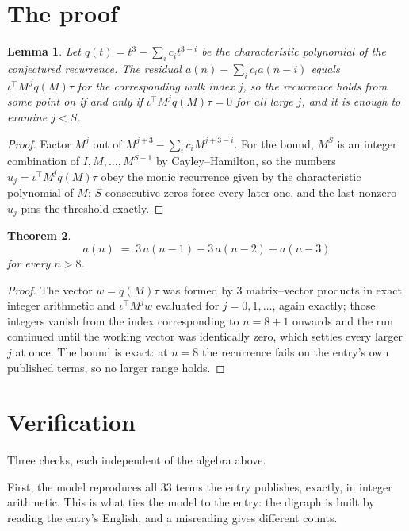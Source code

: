 \documentclass[11pt,a4paper]{article}
\theoremstyle{plain}
\newtheorem{theorem}{Theorem}
\newtheorem{lemma}[theorem]{Lemma}
\theoremstyle{definition}
\begin{document}
\section{The proof}

\begin{lemma}\label{lem:crit}
Let $q(t)=t^{3}-\sum_i c_it^{3-i}$ be the characteristic polynomial of the
conjectured recurrence. The residual $a(n)-\sum_ic_ia(n-i)$ equals
$\iota^{\!\top}M^{\,j}q(M)\tau$ for the corresponding walk index $j$, so the recurrence
holds from some point on if and only if $\iota^{\!\top}M^{j}q(M)\tau=0$ for all large $j$,
and it is enough to examine $j<S$.
\end{lemma}

\begin{proof}
Factor $M^{j}$ out of $M^{j+3}-\sum_ic_iM^{j+3-i}$. For the bound, $M^{S}$
is an integer combination of $I,M,\dots,M^{S-1}$ by Cayley--Hamilton, so the numbers
$u_j=\iota^{\!\top}M^{j}q(M)\tau$ obey the monic recurrence given by the characteristic
polynomial of $M$; $S$ consecutive zeros force every later one, and the last nonzero $u_j$
pins the threshold exactly.
\end{proof}

\begin{theorem}
\[
a(n)\;=\;3\,a(n-1) - 3\,a(n-2) + a(n-3)
\]
for every $n>8$.
\end{theorem}

\begin{proof}
The vector $w=q(M)\tau$ was formed by $3$ matrix--vector products in exact integer
arithmetic and $\iota^{\!\top}M^{j}w$ evaluated for $j=0,1,\dots$, again exactly; those
integers vanish from the index corresponding to $n=8+1$ onwards and the run continued
until the working vector was identically zero, which settles every larger $j$ at once. The bound is exact: at $n=8$ the recurrence fails on the entry's own published terms, so no larger range holds.
\end{proof}

\section{Verification}

Three checks, each independent of the algebra above.

First, the model reproduces all $33$ terms the entry publishes, exactly, in integer
arithmetic. This is what ties the model to the entry: the digraph is built by reading the
entry's English, and a misreading gives different counts.
\end{document}
